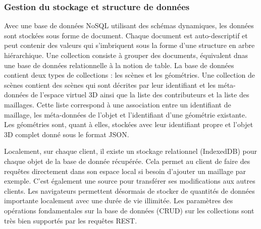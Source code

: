 \subsubsection{Gestion du stockage et structure de données}

Avec une base de données NoSQL utilisant des schémas dynamiques, les 
données sont stockées sous forme de document. Chaque document est 
auto-descriptif et peut contenir des valeurs qui s'imbriquent sous la forme d'une 
structure en arbre hiérarchique. Une collection consiste à grouper des documents, 
équivalent dnas une base de données relationnelle à la notion de table. La base de 
données contient deux types de collections : les scènes et les géométries. Une 
collection de scènes contient des scènes qui sont décrites par leur identifiant et 
les méta-données de l'espace virtuel \gls{3D} ainsi que la liste des contributeurs et 
la 
liste des maillages. Cette liste correspond à une association entre un identifiant de 
maillage, les méta-données de l'objet et l'identifiant d'une géométrie existante. 
Les géométries sont, quant à elles, stockées avec leur identifiant propre et l'objet 
3D complet donné sous le format \gls{JSON}.

Localement, sur chaque client, il existe un stockage relationnel (IndexedDB) pour 
chaque objet de la base de donnée récupérée. Cela permet au client de faire des 
requêtes directement dans son espace local si besoin d'ajouter un maillage par 
exemple. 
C'est également une source pour transférer ses modifications aux autres clients.
Les navigateurs permettent désormais de stocker de quantités de données 
importante localement avec une durée de vie illimitée. 
Les paramètres des opérations fondamentales sur la base de données 
(\gls{CRUD}) sur les collections sont très bien supportés par les requêtes 
\gls{REST}.


